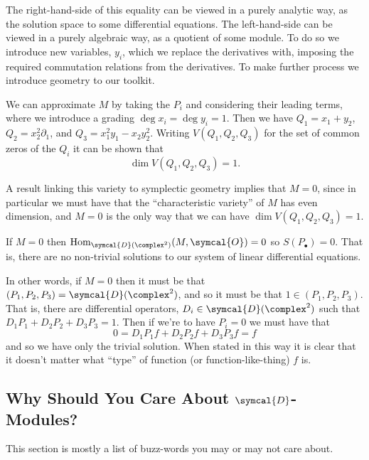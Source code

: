 \documentclass[fleqn]{NotesClass}
\newcommand{\D}{\symcal{D}}
\newcommand{\sheaf}[1]{\symcal{#1}}
\DeclareMathOperator{\Hom}{Hom}
\begin{document}
    The right-hand-side of this equality can be viewed in a purely analytic way, as the solution space to some differential equations.
    The left-hand-side can be viewed in a purely algebraic way, as a quotient of some module.
    To do so we introduce new variables, \(y_i\), which we replace the derivatives with, imposing the required commutation relations from the derivatives.
    To make further process we introduce geometry to our toolkit.
    
    We can approximate \(M\) by taking the \(P_i\) and considering their leading terms, where we introduce a grading \(\deg x_i = \deg y_i = 1\).
    Then we have \(Q_1 = x_1 + y_2\), \(Q_2 = x_2^2 \partial_1\), and \(Q_3 = x_1^2y_1 - x_2y_2^2\).
    Writing \(V(Q_1, Q_2, Q_3)\) for the set of common zeros of the \(Q_i\) it can be shown that
    \begin{equation}
        \dim V(Q_1, Q_2, Q_3) = 1.
    \end{equation}
    
    A result linking this variety to symplectic geometry implies that \(M = 0\), since in particular we must have that the \enquote{characteristic variety} of \(M\) has even dimension, and \(M = 0\) is the only way that we can have \(\dim V(Q_1, Q_2, Q_3) = 1\).
    
    If \(M = 0\) then \(\Hom_{\D(\complex^2)}(M, \sheaf{O}) = 0\) so \(S(P_{\bullet}) = 0\).
    That is, there are no non-trivial solutions to our system of linear differential equations.
    
    In other words, if \(M = 0\) then it must be that \((P_1, P_2, P_3) = \D(\complex^2)\), and so it must be that \(1 \in (P_1, P_2, P_3)\).
    That is, there are differential operators, \(D_i \in \D(\complex^2)\) such that \(D_1P_1 + D_2P_2 + D_3P_3 = 1\).
    Then if we're to have \(P_i = 0\) we must have that
    \begin{equation}
        0 = D_1P_1f + D_2P_2f + D_3P_3f = f
    \end{equation}
    and so we have only the trivial solution.
    When stated in this way it is clear that it doesn't matter what \enquote{type} of function (or function-like-thing) \(f\) is.
    
    \subsection{Why Should You Care About \texorpdfstring{\(\D\)}{D}-Modules?}
    This section is mostly a list of buzz-words you may or may not care about.
    
\end{document}
